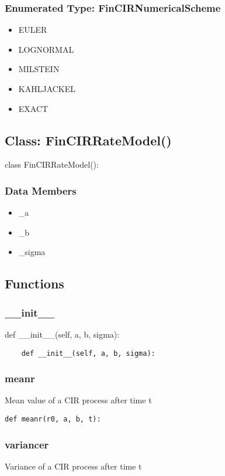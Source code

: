 \documentclass[twoside,11pt]{book}
\begin{document}
\subsubsection{Enumerated Type: FinCIRNumericalScheme}
\begin{itemize}
\item{EULER}
\item{LOGNORMAL}
\item{MILSTEIN}
\item{KAHLJACKEL}
\item{EXACT}
\end{itemize}

\subsection*{Class: FinCIRRateModel()}
class FinCIRRateModel(): 

\subsubsection*{Data Members}
\begin{itemize}
\item{\_a}
\item{\_b}
\item{\_sigma}
\end{itemize}

\subsection*{Functions}

\subsubsection*{{\bf \_\_init\_\_}}
def \_\_init\_\_(self, a, b, sigma): 

\begin{lstlisting}
    def __init__(self, a, b, sigma):
\end{lstlisting}

\subsubsection*{{\bf meanr}}
Mean value of a CIR process after time t  

\begin{lstlisting}
def meanr(r0, a, b, t):
\end{lstlisting}

\subsubsection*{{\bf variancer}}
Variance of a CIR process after time t  
\end{document}
